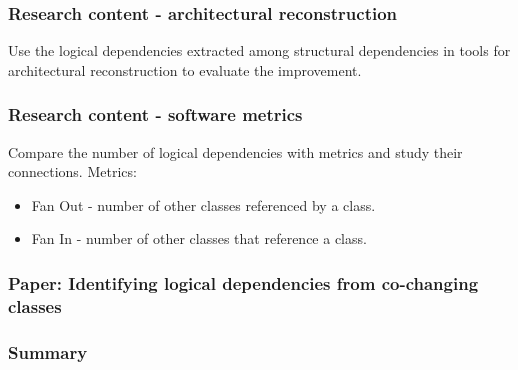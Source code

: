 \documentclass{beamer}
\begin{document}
 \begin{frame}
\frametitle{Research content - architectural reconstruction}
Use the logical dependencies extracted among structural dependencies in tools for architectural reconstruction to evaluate the improvement.

\end{frame}

 \begin{frame}
\frametitle{Research content - software metrics}
Compare the number of logical dependencies with metrics and study their connections. Metrics:
\begin{itemize}
	\item  Fan Out - number of other classes referenced by a class.
	\item  Fan In - number of other classes that reference a class.
\end{itemize}

\end{frame}


 \begin{frame}
\frametitle{Paper: Identifying logical dependencies from co-changing classes}

\end{frame}


 \begin{frame}
\frametitle{Summary}

\end{frame}
\end{document}
